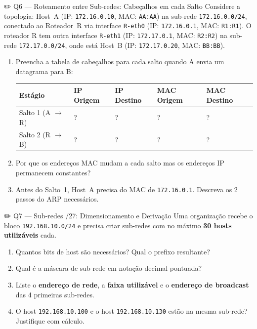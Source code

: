 \documentclass[11pt,a4paper]{article}
\begin{document}
\begin{questao}{✏️ Q6 --- Roteamento entre Sub-redes: Cabeçalhos em cada Salto}
Considere a topologia: Host~A (IP: \texttt{172.16.0.10}, MAC: \texttt{AA:AA}) na sub-rede \texttt{172.16.0.0/24}, conectado ao Roteador~R via interface \texttt{R-eth0} (IP: \texttt{172.16.0.1}, MAC: \texttt{R1:R1}). O roteador R tem outra interface \texttt{R-eth1} (IP: \texttt{172.17.0.1}, MAC: \texttt{R2:R2}) na sub-rede \texttt{172.17.0.0/24}, onde está Host~B (IP: \texttt{172.17.0.20}, MAC: \texttt{BB:BB}).

\begin{enumerate}[label=(\alph*)]
    \item Preencha a tabela de cabeçalhos para cada salto quando A envia um datagrama para B:
\begin{center}
\begin{tabular}{lllll}
\toprule
\textbf{Estágio} & \textbf{IP Origem} & \textbf{IP Destino} & \textbf{MAC Origem} & \textbf{MAC Destino} \\
\midrule
Salto 1 (A $\to$ R) & ? & ? & ? & ? \\
Salto 2 (R $\to$ B) & ? & ? & ? & ? \\
\bottomrule
\end{tabular}
\end{center}
    \item Por que os endereços MAC mudam a cada salto mas os endereços IP permanecem constantes?
    \item Antes do Salto~1, Host~A precisa do MAC de \texttt{172.16.0.1}. Descreva os 2 passos do ARP necessários.
\end{enumerate}
\end{questao}

\begin{questao}{✏️ Q7 --- Sub-redes /27: Dimensionamento e Derivação}
Uma organização recebe o bloco \texttt{192.168.10.0/24} e precisa criar sub-redes com no máximo \textbf{30 hosts utilizáveis} cada.
\begin{enumerate}[label=(\alph*)]
    \item Quantos bits de host são necessários? Qual o prefixo resultante?
    \item Qual é a máscara de sub-rede em notação decimal pontuada?
    \item Liste o \textbf{endereço de rede}, a \textbf{faixa utilizável} e o \textbf{endereço de broadcast} das 4 primeiras sub-redes.
    \item O host \texttt{192.168.10.100} e o host \texttt{192.168.10.130} estão na mesma sub-rede? Justifique com cálculo.
\end{enumerate}
\end{questao}
\end{document}
